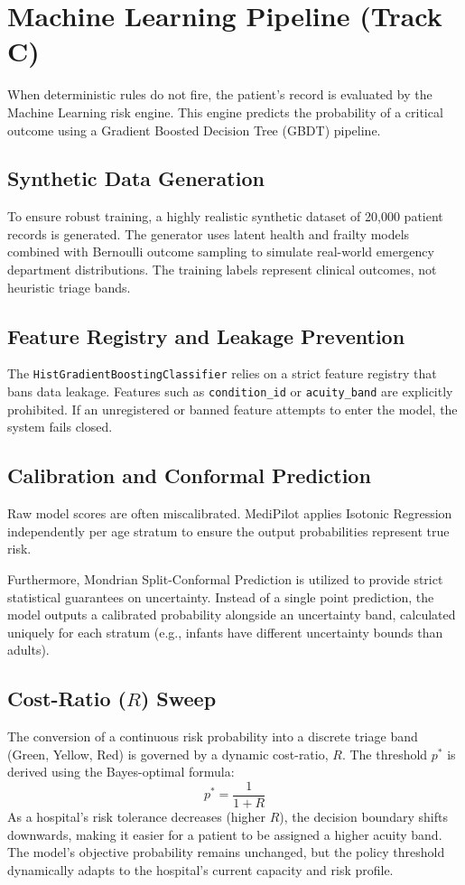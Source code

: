 \section{Machine Learning Pipeline (Track C)}

When deterministic rules do not fire, the patient's record is evaluated by the Machine Learning risk engine. This engine predicts the probability of a critical outcome using a Gradient Boosted Decision Tree (GBDT) pipeline.

\subsection{Synthetic Data Generation}
To ensure robust training, a highly realistic synthetic dataset of 20,000 patient records is generated. The generator uses latent health and frailty models combined with Bernoulli outcome sampling to simulate real-world emergency department distributions. The training labels represent clinical outcomes, not heuristic triage bands.

\subsection{Feature Registry and Leakage Prevention}
The \texttt{HistGradientBoostingClassifier} relies on a strict feature registry that bans data leakage. Features such as \texttt{condition\_id} or \texttt{acuity\_band} are explicitly prohibited. If an unregistered or banned feature attempts to enter the model, the system fails closed.

\subsection{Calibration and Conformal Prediction}
Raw model scores are often miscalibrated. MediPilot applies Isotonic Regression independently per age stratum to ensure the output probabilities represent true risk. 

Furthermore, Mondrian Split-Conformal Prediction is utilized to provide strict statistical guarantees on uncertainty. Instead of a single point prediction, the model outputs a calibrated probability alongside an uncertainty band, calculated uniquely for each stratum (e.g., infants have different uncertainty bounds than adults).

\subsection{Cost-Ratio ($R$) Sweep}
The conversion of a continuous risk probability into a discrete triage band (Green, Yellow, Red) is governed by a dynamic cost-ratio, $R$. The threshold $p^*$ is derived using the Bayes-optimal formula:
\[ p^* = \frac{1}{1 + R} \]
As a hospital's risk tolerance decreases (higher $R$), the decision boundary shifts downwards, making it easier for a patient to be assigned a higher acuity band. The model’s objective probability remains unchanged, but the policy threshold dynamically adapts to the hospital's current capacity and risk profile.
